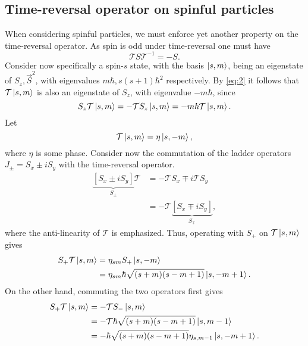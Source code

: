 \subsection{Time-reversal operator on spinful particles}
When considering spinful particles, we must enforce yet another property on the time-reversal operator.
As spin is odd under time-reversal one must have
\begin{equation}
  \label{eq:2}
  \mathcal{T} S \mathcal{T}^{-1} = -S.
\end{equation}
Consider now specifically a spin-$s$ state, with the basis $\ket{s, m}$, being an eigenstate of $S_z, \vec{S}^2$, with eigenvalues $m\hbar, s(s+1) \hbar^2$ respectively.
By \cref{eq:2} it follows that $\mathcal{T} \ket{s, m}$ is also an  eigenstate of $S_z$, with eigenvalue $-m \hbar $, since
\begin{equation}
  S_z \mathcal{T} \ket{s, m} = -\mathcal{T}  S_z \ket{s, m} = -m \hbar \mathcal{T} \ket{s, m}.
\end{equation}
Let
\[
  \mathcal{T} \ket{s, m} = \eta \ket{s, -m},
\]
where $\eta $ is some phase.
Consider now the commutation of the ladder operators $J_{\pm} = S_x \pm i S_y$ with the time-reversal operator.
\begin{equation}
  \begin{split}
    \underbrace{\left[ S_x \pm i S_y \right]}_{S_{\pm}} \mathcal{T}  &= -\mathcal{T} S_x \mp i \mathcal{T} S_y\\
    &= -\mathcal{T} \underbrace{\left[ S_x \mp iS_y \right]}_{S_{\mp}},
  \end{split}
\end{equation}
where the anti-linearity of $\mathcal{T} $ is emphasized.
Thus, operating with $S_+$ on $\mathcal{T} \ket{s, m}$ gives
\begin{equation}
  \begin{split}
  S_+ \mathcal{T} \ket{s, m} &= \eta_{sm} S_+ \ket{s, -m}\\
  &= \eta_{sm} \hbar \sqrt{(s+m) (s-m+1)} \ket{s, -m +  1}.
  \end{split}
\end{equation}
On the other hand, commuting the two operators first gives
\begin{equation}
  \begin{split}
  S_+ \mathcal{T}  \ket{s, m} &= - \mathcal{T}  S_- \ket{s, m}\\
                         &= - \mathcal{T} \hbar \sqrt{(s+m)(s-m+1)} \ket{s, m-1}\\
  &= -\hbar \sqrt{(s+m)(s-m+1)} \eta_{s, m-1} \ket{s, -m + 1}.
  \end{split}
\end{equation}
